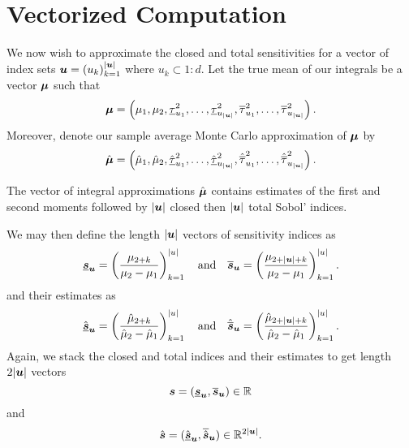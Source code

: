 \documentclass{article}
\begin{document}
\section{Vectorized Computation}

We now wish to approximate the closed and total sensitivities for a vector of index sets $\boldsymbol{u} = \left(u_k\right)_{k=1}^{\lvert \boldsymbol{u} \rvert}$ where $u_k \subset 1:d$. Let the true mean of our integrals be a vector $\boldsymbol{\mu}$ such that 
\begin{equation}
    \label{eq:bmu}
    \boldsymbol{\mu} = \left(\mu_1,\mu_2,\underline{\tau}_{u_1}^2,\dots,\underline{\tau}_{u_{\lvert \boldsymbol{u} \rvert}}^2,\overline{\tau}_{u_1}^2,\dots,\overline{\tau}_{u_{\lvert \boldsymbol{u} \rvert}}^2\right).
\end{equation}
Moreover, denote our sample average Monte Carlo approximation of $\boldsymbol{\mu}$ by
\begin{equation}
    \label{eq:bmu_hat}
    \hat{\boldsymbol{\mu}} = \left(\hat{\mu}_1,\hat{\mu}_2,\hat{\underline{\tau}}_{u_1}^2,\dots,\hat{\underline{\tau}}_{u_{\lvert \boldsymbol{u} \rvert}}^2,\hat{\overline{\tau}}_{u_1}^2,\dots,\hat{\overline{\tau}}_{u_{\lvert \boldsymbol{u} \rvert}}^2\right).
\end{equation}

The vector of integral approximations $\hat{\boldsymbol{\mu}}$ contains estimates of the first and second moments followed by $\lvert \boldsymbol{u} \rvert$ closed then $\lvert \boldsymbol{u} \rvert$ total Sobol' indices. 

We may then define the length $\lvert \boldsymbol{u} \rvert$ vectors of sensitivity indices as 
\begin{equation}
    \label{eq:bs_split}
    \underline{\boldsymbol{s}}_{\boldsymbol{u}} = \left(\frac{\mu_{2+k}}{\mu_2-\mu_1}\right)_{k=1}^{\lvert u \rvert} \quad \text{and} \quad 
    \overline{\boldsymbol{s}}_{\boldsymbol{u}} = \left(\frac{\mu_{2+\lvert \boldsymbol{u} \rvert + k}}{\mu_2-\mu_1}\right)_{k=1}^{\lvert u \rvert}.
\end{equation}
and their estimates as 
\begin{equation}
    \label{eq:bs_hat_split}
    \hat{\underline{\boldsymbol{s}}}_{\boldsymbol{u}} = \left(\frac{\hat{\mu}_{2+k}}{\hat{\mu}_2-\hat{\mu}_1}\right)_{k=1}^{\lvert u \rvert} \quad \text{and} \quad 
    \hat{\overline{\boldsymbol{s}}}_{\boldsymbol{u}} = \left(\frac{\hat{\mu}_{2+\lvert \boldsymbol{u} \rvert + k}}{\hat{\mu}_2-\hat{\mu}_1}\right)_{k=1}^{\lvert u \rvert}.
\end{equation}
Again, we stack the closed and total indices and their estimates to get length $2\lvert \boldsymbol{u} \rvert$ vectors 
\begin{equation}
    \label{eq:bs}
    \boldsymbol{s} = (\underline{\boldsymbol{s}}_{\boldsymbol{u}},\overline{\boldsymbol{s}}_{\boldsymbol{u}}) \in \mathbb{R}^{}
\end{equation}
and 
\begin{equation}
    \label{eq:bs_hat}
    \hat{\boldsymbol{s}} = (\underline{\hat{\boldsymbol{s}}}_{\boldsymbol{u}},\overline{\hat{\boldsymbol{s}}}_{\boldsymbol{u}}) \in \mathbb{R}^{2\lvert \boldsymbol{u} \rvert}.
\end{equation}
\end{document}
